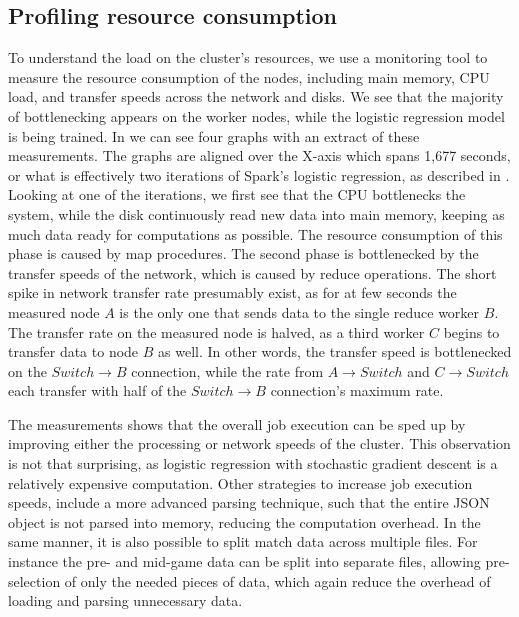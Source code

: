 \subsection{Profiling resource consumption}\label{sec:profile}
To understand the load on the cluster's resources, we use a monitoring tool to measure the resource consumption of the nodes, including main memory, CPU load, and transfer speeds across the network and disks. We see that the majority of bottlenecking appears on the worker nodes, while the logistic regression model is being trained. In 
we can see four graphs with an extract of these measurements. The graphs are aligned over the X-axis which spans 1,677 seconds, or what is effectively two iterations of Spark's logistic regression, as described in . Looking at one of the iterations, we first see that the CPU bottlenecks the system, while the disk continuously read new data into main memory, keeping as much data ready for computations as possible. The resource consumption of this phase is caused by map procedures. The second phase is bottlenecked by the transfer speeds of the network, which is caused by reduce operations. The short spike in network transfer rate presumably exist, as for at few seconds the measured node $A$ is the only one that sends data to the single reduce worker $B$. The transfer rate on the measured node is halved, as a third worker $C$ begins to transfer data to node $B$ as well. In other words, the transfer speed is bottlenecked on the $Switch \rightarrow B$ connection, while the rate from $A \rightarrow Switch$ and $C \rightarrow Switch$ each transfer with half of the $Switch \rightarrow B$ connection's maximum rate.

The measurements shows that the overall job execution can be sped up by improving either the processing or network speeds of the cluster. This observation is not that surprising, as logistic regression with stochastic gradient descent is a relatively expensive computation. Other strategies to increase job execution speeds, include a more advanced parsing technique, such that the entire JSON object is not parsed into memory, reducing the computation overhead. In the same manner, it is also possible to split match data across multiple files. For instance the pre- and mid-game data can be split into separate files, allowing pre-selection of only the needed pieces of data, which again reduce the overhead of loading and parsing unnecessary data.

